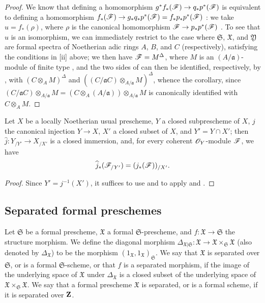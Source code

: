 \begin{proof}
\label{proof-1.10.14.6}
We know that defining a homomorphism $g^*f_*(\sh{F}) \to q_*p^*(\sh{F})$ is equivalent to defining a homomorphism $f_*(\sh{F}) \to g_*q_*p^*(\sh{F}) = f_*p_*p^*(\sh{F})$ :
we take $u=f_*(\rho)$, where $\rho$ is the canonical homomorphism $\sh{F}\to p_*p^*(\sh{F})$ .
To see that $u$ is an isomorphism, we can immediately restrict to the case where $\mathfrak{S}$, $\mathfrak{X}$, and $\mathfrak{Y}$ are formal spectra of Noetherian adic rings $A$, $B$, and $C$ (respectively), satisfying the conditions in [ii] above;
we then have $\mathscr{F}=M^\Delta$, where $M$ is an $(A/\mathfrak{a})$-module of finite type , and the two sides of  can then be identified, respectively, by , with $(C\otimes_A M)^\Delta$ and $((C/\mathfrak{a}C)\otimes_{A/\mathfrak{a}}M)^\Delta$, whence the corollary, since $(C/\mathfrak{a}C)\otimes_{A/\mathfrak{a}}M = (C\otimes_A(A/\mathfrak{a}))\otimes_{A/\mathfrak{a}}M$ is canonically identified with $C\otimes_A M$.
\end{proof}

\begin{corollary}[10.14.7]
\label{1.10.14.7}
Let $X$ be a locally Noetherian usual prescheme, $Y$ a closed subprescheme of $X$, $j$ the canonical injection $Y\to X$, $X'$ a closed subset of $X$, and $Y'=Y\cap X'$;
then $\widehat{j}:Y_{/Y'}\to X_{/X'}$ is a closed immersion, and, for every coherent $\mathscr{O}_Y$-module $\mathscr{F}$, we have
\[
    \widehat{j}_*(\mathscr{F}_{/Y'}) = (j_*(\mathscr{F}))_{/X'}.
\]
\end{corollary}

\begin{proof}
\label{proof-1.10.14.7}
Since $Y'=j^{-1}(X')$, it suffices to use  and to apply  and .
\end{proof}

\subsection{Separated formal preschemes}
\label{subsection:1.10.15}

\begin{definition}[10.15.1]
\label{1.10.15.1}
Let $\mathfrak{S}$ be a formal prescheme, $\mathfrak{X}$ a formal $\mathfrak{S}$-prescheme, and $f:\mathfrak{X}\to\mathfrak{S}$ the structure morphism.
We define the diagonal morphism $\Delta_{\mathfrak{X}|\mathfrak{S}}:\mathfrak{X}\to\mathfrak{X}\times_\mathfrak{S}\mathfrak{X}$ (also denoted by $\Delta_\mathfrak{X}$) to be the morphism $(1_\mathfrak{X},1_\mathfrak{X})_\mathfrak{S}$.
We say that $\mathfrak{X}$ is separated over $\mathfrak{S}$, or is a formal $\mathfrak{S}$-scheme, or that $f$ is a separated morphism, if the image of the underlying space of $\mathfrak{X}$ under $\Delta_\mathfrak{X}$ is a closed subset of the underlying space of $\mathfrak{X}\times_\mathfrak{S}\mathfrak{X}$.
We say that a formal prescheme $\mathfrak{X}$ is separated, or is a formal scheme, if it is separated over $\mathbf{Z}$.
\end{definition}


